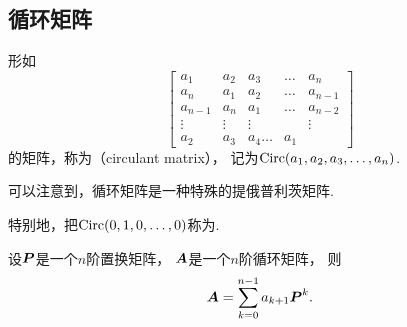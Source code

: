 \subsection{循环矩阵}
形如\begin{equation*}
	\begin{bmatrix}
		a_1 & a_2 & a_3 & \dots & a_n \\
		a_n & a_1 & a_2 & \dots & a_{n-1} \\
		a_{n-1} & a_n & a_1 & \dots & a_{n-2} \\
		\vdots & \vdots & \vdots & & \vdots \\
		a_2 & a_3 & a_4 \dots & a_1
	\end{bmatrix}
\end{equation*}
的矩阵，称为（circulant matrix），
记为\(\operatorname{Circ}(a_1,a_2,a_3,\dotsc,a_n)\).


可以注意到，循环矩阵是一种特殊的提俄普利茨矩阵.

特别地，把\(\operatorname{Circ}(0,1,0,\dotsc,0)\)称为.

\begin{proposition}
设\(\boldsymbol{P}\)是一个\(n\)阶置换矩阵，
\(\boldsymbol{A}\)是一个\(n\)阶循环矩阵，
则\begin{equation*}
	\boldsymbol{A} = \sum_{k=0}^{n-1} a_{k+1} \boldsymbol{P}^k.
\end{equation*}
\end{proposition}
